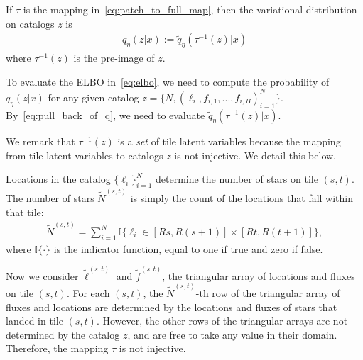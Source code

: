 If $\tau$ is the mapping in~\eqref{eq:patch_to_full_map}, then the variational distribution on catalogs $z$ is
\begin{align}
    q_\eta(z | x) := \tilde q_\eta(\tau^{-1}(z) | x)
    \label{eq:pull_back_of_q}
\end{align}
where $\tau^{-1}(z)$ is the pre-image of $z$.



\noindent To evaluate
the ELBO in~\eqref{eq:elbo}, 
we need to compute the probability of 
$q_\eta(z | x)$
for any given catalog $z = \{N, (\ell_i, f_{i,1}, ..., f_{i,B})_{i = 1}^N\}$. By~\eqref{eq:pull_back_of_q}, 
we need to evaluate $\tilde q_\eta(\tau^{-1}(z) | x)$. 

We remark that $\tau^{-1}(z)$ is a {\itshape set} of tile latent variables because the mapping from tile latent variables to catalogs $z$ is not injective. We detail this below. 

Locations in the catalog $\{\ell_i\}_{i=1}^N$
determine the number of stars on tile $(s,t)$. 
The number of stars $\tilde N^{(s,t)}$ is simply the count of the locations that fall within that tile:
\begin{align}
\tilde N^{(s,t)} = \sum_{i=1}^N 
\mathbb{I}\Big\{\ell_i\in [Rs, R(s+1)] \times [Rt, R(t+1)]\Big\},
\end{align}
where $\mathbb{I}\{\cdot\}$ is the indicator function, equal to one if true and zero if false.

Now we consider $\tilde\ell^{(s, t)}$ and $\tilde f^{(s, t)}$, the triangular array of locations and fluxes on tile $(s,t)$. 
For each $(s,t)$, the $\tilde N^{(s,t)}$-th row 
of the triangular array of fluxes and locations are 
determined by the locations and fluxes of stars that landed in tile $(s,t)$. However, the other rows 
of the triangular arrays are not determined by 
the catalog $z$, and are free to take any value in their domain. Therefore, the mapping $\tau$ is not injective. 

